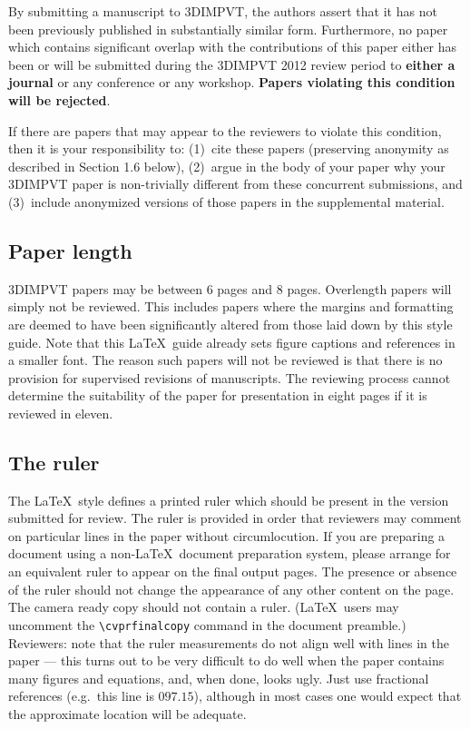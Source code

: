 \documentclass[10pt,twocolumn,letterpaper]{article}
\begin{document}
By submitting a manuscript to 3DIMPVT, the authors assert that it has
not been previously published in substantially similar
form. Furthermore, no paper which contains significant overlap with
the contributions of this paper either has been or will be submitted
during the 3DIMPVT 2012 review period to {\bf either a journal} or any
conference or any workshop.  {\bf Papers violating this condition will
  be rejected}.

If there are papers that may appear to the reviewers to violate this
condition, then it is your responsibility to: (1)~cite these papers
(preserving anonymity as described in Section 1.6 below), (2)~argue in
the body of your paper why your 3DIMPVT paper is non-trivially
different from these concurrent submissions, and (3)~include
anonymized versions of those papers in the supplemental material.

\subsection{Paper length}
3DIMPVT papers may be between 6 pages and 8 pages.  Overlength papers
will simply not be reviewed.  This includes papers where the margins
and formatting are deemed to have been significantly altered from
those laid down by this style guide.  Note that this \LaTeX\ guide
already sets figure captions and references in a smaller font.  The
reason such papers will not be reviewed is that there is no provision
for supervised revisions of manuscripts.  The reviewing process cannot
determine the suitability of the paper for presentation in eight pages
if it is reviewed in eleven.

\subsection{The ruler}
The \LaTeX\ style defines a printed ruler which should be present in
the version submitted for review.  The ruler is provided in order that
reviewers may comment on particular lines in the paper without
circumlocution.  If you are preparing a document using a non-\LaTeX\
document preparation system, please arrange for an equivalent ruler to
appear on the final output pages.  The presence or absence of the
ruler should not change the appearance of any other content on the
page.  The camera ready copy should not contain a ruler. (\LaTeX\
users may uncomment the \verb'\cvprfinalcopy' command in the document
preamble.)  Reviewers: note that the ruler measurements do not align
well with lines in the paper --- this turns out to be very difficult
to do well when the paper contains many figures and equations, and,
when done, looks ugly.  Just use fractional references (e.g.\ this
line is $097.15$), although in most cases one would expect that the
approximate location will be adequate.
\end{document}
